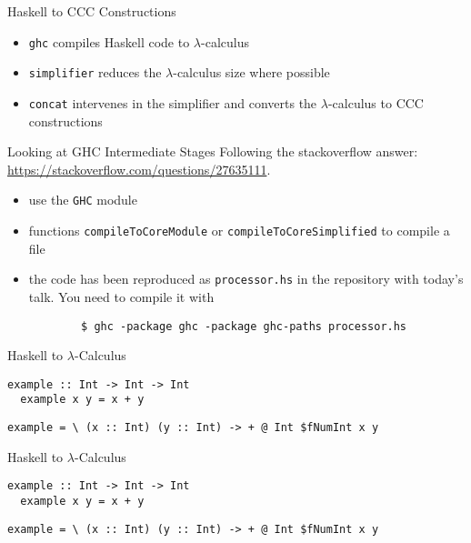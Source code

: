 \documentclass[10pt]{beamer}
\newcommand{\program}[1]{\texttt{#1}}
\theoremstyle{definition}
\theoremstyle{remark}
\numberwithin{equation}{section}
\begin{document}
\begin{frame}[fragile]{Haskell to CCC Constructions}
  \begin{itemize}
    \item \program{ghc} compiles Haskell code to $\lambda$-calculus
    \item \program{simplifier} reduces the $\lambda$-calculus size where possible
    \item \program{concat} intervenes in the simplifier and converts the $\lambda$-calculus to CCC constructions
  \end{itemize}
\end{frame}

\begin{frame}[fragile]{Looking at GHC Intermediate Stages}
  Following the stackoverflow answer: \url{https://stackoverflow.com/questions/27635111}.
  \begin{itemize}
    \item use the \lstinline{GHC} module
    \item functions \lstinline{compileToCoreModule} or \lstinline{compileToCoreSimplified} to compile a file
    \item the code has been reproduced as \lstinline{processor.hs} in the repository with today's talk. You need to compile it with
      \begin{lstlisting}
        $ ghc -package ghc -package ghc-paths processor.hs
      \end{lstlisting}
  \end{itemize}
\end{frame}

\begin{frame}[fragile]{Haskell to $\lambda$-Calculus}
  \begin{lstlisting}[frame=single]
  example :: Int -> Int -> Int
  example x y = x + y
  \end{lstlisting}

  \begin{lstlisting}[frame=single]
  example = \ (x :: Int) (y :: Int) -> + @ Int $fNumInt x y
  \end{lstlisting}
\end{frame}

\begin{frame}[fragile]{Haskell to $\lambda$-Calculus}
  \begin{lstlisting}[frame=single]
  example :: Int -> Int -> Int
  example x y = x + y
  \end{lstlisting}

  \begin{lstlisting}[frame=single]
  example = \ (x :: Int) (y :: Int) -> + @ Int $fNumInt x y
  \end{lstlisting}
\end{frame}
\end{document}
